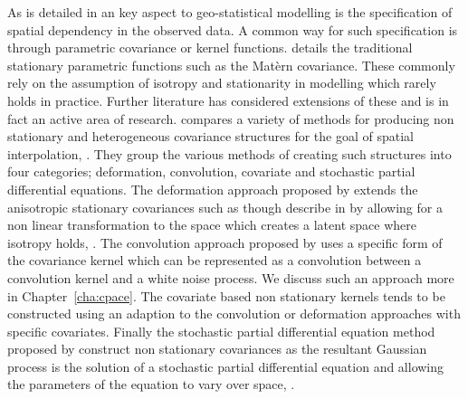 As is detailed in \cite{cressie_statistics_2010} an key aspect to geo-statistical modelling is the specification of spatial dependency in the observed data. A common way for such specification is through parametric covariance or kernel functions. \cite{cressie_statistics_2010} details the traditional stationary parametric functions such as the Mat\`{e}rn covariance. These commonly rely on the assumption of isotropy and stationarity in modelling which rarely holds in practice.  Further literature has considered extensions of these and is in fact an active area of research. \citeauthor{schmidt_flexible_2020} compares a variety of methods for producing non stationary and heterogeneous covariance structures for the goal of spatial interpolation, \citep{schmidt_flexible_2020}. They group the various methods of creating such structures into four categories; deformation, convolution, covariate and stochastic partial differential equations.  The deformation approach proposed by \citeauthor{sampson_nonparametric_1992} extends the anisotropic stationary covariances such as though describe in \cite{cressie_statistics_2010} by allowing for a non linear transformation to the space which creates a latent space where isotropy holds, \cite{sampson_nonparametric_1992}. The convolution approach proposed by \citeauthor{higdon_space_2002} uses a specific form of the covariance kernel which can be represented as a convolution between a convolution kernel and a white noise process. We discuss such an approach more in Chapter~\ref{cha:cpace}. The covariate based non stationary kernels tends to be constructed using an adaption to the convolution or deformation approaches with specific covariates. Finally the stochastic partial differential equation method proposed by \citeauthor{lindgren_explicit_2011} construct non stationary covariances as the resultant Gaussian process is the solution of a stochastic partial differential equation and allowing the parameters of the equation to vary over space, \citep{lindgren_explicit_2011}. 

